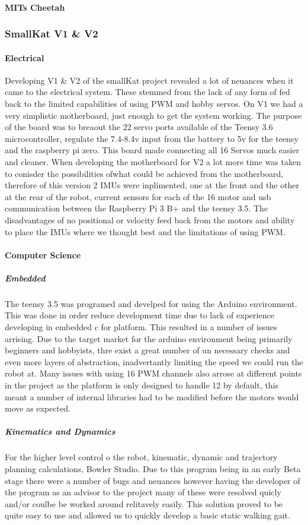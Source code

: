     \paragraph{MITs Cheetah}
    
    
\subsubsection{SmallKat V1 \& V2}
    \paragraph{Electrical}
    Developing V1 \& V2 of the smallKat project revealed a lot of neuances when it came to the electrical system. These stemmed from the lack of any form of fed back to the limited capabilities of using PWM and hobby servos. On V1 we had a very simplistic motherboard, just enough to get the system working. The purpose of the board was to breaout the 22 servo ports available of the Teensy 3.6 microcontroller, regulate the 7.4-8.4v input from the battery to 5v for the teensy and the raspberry pi zero. This board made connecting all 16 Servos much easier and cleaner. When developing the motherboard for V2 a lot more time was taken to conisder the possibilities ofwhat could be achieved from the motherboard, therefore of this version 2 IMUs were inplimented, one at the front and the other at the rear of the robot, current sensors for each of the 16 motor and usb communication between the Raspberry Pi 3 B+ and the teensy 3.5. The disadvantages of no positional or velocity feed back from the motors and ability to place the IMUs where we thought best and the limitations of using PWM. 
    \paragraph{Computer Science}
    \subparagraph{Embedded}
    The teensy 3.5 was programed and develped for using the Arduino environment. This was done in order reduce development time due to lack of experience developing in embedded c for platform. This resulted in a number of issues arrising. Due to the target market for the arduino environment being primarily beginners and hobbyists, thre exist a great number of un necessary checks and even more layers of abstraction, inadvertantly limiting the speed we could run the robot at. Many issues with using 16 PWM channels also arrose at different points in the project as the platform is only designed to handle 12 by default, this meant a number of internal libraries had to be modified before the motors would move as expected. 
    \subparagraph{Kinematics and Dynamics}
    For the higher level control o the robot, kinematic, dynamic and trajectory planning calculations, Bowler Studio. Due to this program being in an early Beta stage there were a number of bugs and neuances however having the developer of the program as an advisor to the project many of these were resolved quicly and/or coulbe be worked around relitavely easily. This solution proved to be quite easy to use and allowed us to quickly develop a basic static walking gait. 

